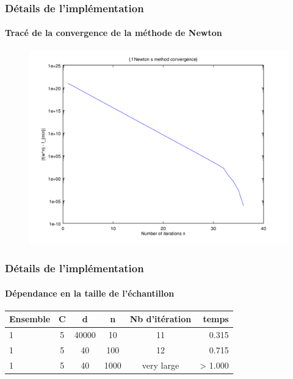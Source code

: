 \documentclass{beamer}
\begin{document}
\begin{frame}
\frametitle{Détails de l'implémentation}
\framesubtitle{Tracé de la convergence de la méthode de Newton}


         \begin{figure}
         \centering
         \includegraphics[scale=0.4]{images/cvnewton4.png}
         \end{figure}

\end{frame}

\begin{frame}
\frametitle{Détails de l'implémentation}
\framesubtitle{Dépendance en la taille de l'échantillon}


         \begin{center}
                \begin{tabular}{| l | c | c | c | c | r |}
                \hline
                Ensemble & C & d & n & Nb d'itération & temps \\ \hline
                1 & 5 & 40000 & 10 & 11 & 0.315 \\ \hline
                1 & 5 & 40 & 100 & 12 & 0.715 \\ \hline
                1 & 5 & 40 & 1000 & very large & > 1.000 \\ \hline
                \end{tabular}
         \end{center}

\end{frame}
\end{document}
